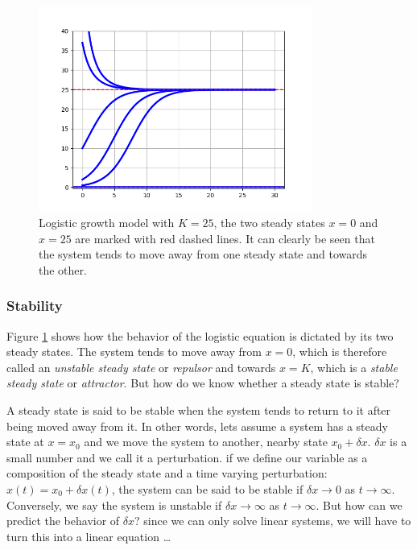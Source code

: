\documentclass[12pt]{article}
\begin{document}
\begin{figure}
	\begin{center}
		\includegraphics[width=0.8\textwidth]{logisticall}
	\end{center}
	\caption{Logistic growth model with $K=25$, the two steady states $x=0$ and $x=25$ are marked with red dashed lines. It can clearly be seen that the system tends to move away from one steady state and towards the other.}
	\label{fig:logisticall}
\end{figure}

\subsubsection{Stability}

Figure \ref{fig:logisticall} shows how the behavior of the logistic equation is dictated by its two steady states. The system tends to move away from $x=0$, which is therefore called an \emph{unstable steady state} or \emph{repulsor} and towards $x=K$, which is a \emph{stable steady state} or \emph{attractor}. But how do we know whether a steady state is stable?

A steady state is said to be stable when the system tends to return to it after being moved away from it. In other words, lets assume a system has a steady state at $x=x_0$ and we move the system to another, nearby state $x_0+\delta x$. $\delta x$ is a small number and we call it a perturbation. if we define our variable as a composition of the steady state and a time varying perturbation: $x(t) = x_0 + \delta x(t)$, the system can be said to be stable if $\delta x \rightarrow 0$ as $t \rightarrow \infty$. Conversely, we say the system is unstable if $\delta x \rightarrow \infty$ as $t \rightarrow \infty$.  But how can we predict the behavior of $\delta x$? since we can only solve linear systems, we will have to turn this into a linear equation \dots
\end{document}
